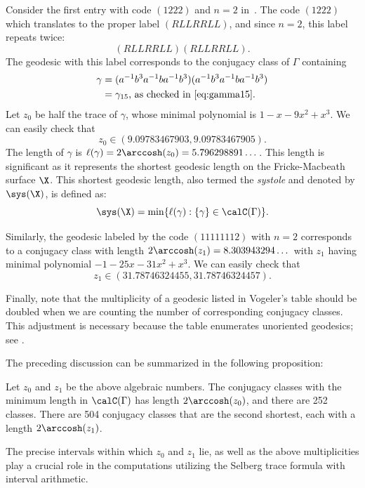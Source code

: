 Consider the first entry with code $(1222)$ and $n=2$ in~\cite[Table C.2]{Vogeler2003}.
The code \((1222)\) which translates to the proper label $(RLLRRLL)$, and since \(n = 2\), this label repeats twice:
\[
(RLLRRLL)(RLLRRLL).
\]
The geodesic with this label corresponds to the conjugacy class of $\Gamma$ containing
\begin{align*}
\gamma
&= (a^{-1}b^3a^{-1}ba^{-1}b^3)(a^{-1}b^3a^{-1}ba^{-1}b^3) \\
&= \gamma_{15} \text{, as checked in } \eqref{eq:gamma15}.
\end{align*}
Let $z_0$ be half the trace of $\gamma$, whose minimal polynomial is $1-x-9 x^2+x^3$.
We can easily check that 
\[z_0 \in (9.09783467903, 9.09783467905).\]
The length of $\gamma$ is $\ell(\gamma) = 2 \arccosh(z_0) = 5.796298891\dots$.
This length is significant as it represents the shortest geodesic length on the Fricke-Macbeath surface $\X$.
This shortest geodesic length, also termed the \textit{systole} and denoted by \( \sys(\X) \), is defined as:
\[
\sys(\X) = \min \{ \ell(\gamma) : \{\gamma\} \in \calC(\Gamma) \}.
\]

Similarly, the geodesic labeled by the code $(11111112)$ with $n=2$ corresponds to a conjugacy class with length 
$2 \arccosh(z_1) = 8.303943294\dots$ with $z_1$ having minimal polynomial $-1-25 x-31 x^2+x^3$.
We can easily check that 
\[z_1 \in (31.78746324455, 31.78746324457).\]

Finally, note that the multiplicity of a geodesic listed in Vogeler's table should be doubled when we are counting the number of corresponding conjugacy classes.
This adjustment is necessary because the table enumerates unoriented geodesics; see \cite[Definition 9]{Vogeler2003}.

The preceding discussion can be summarized in the following proposition:
\begin{prop}\label{prop:shortgeo}
Let $z_0$ and $z_1$ be the above algebraic numbers.
The conjugacy classes with the minimum length in $\calC(\Gamma)$ has length $2\arccosh(z_0)$, and there are 252 classes. 
There are 504 conjugacy classes that are the second shortest, each with a length $2\arccosh(z_1)$.
\end{prop}
The precise intervals within which $z_0$ and $z_1$ lie, as well as the above multiplicities play a crucial role in the computations utilizing the Selberg trace formula with interval arithmetic.


